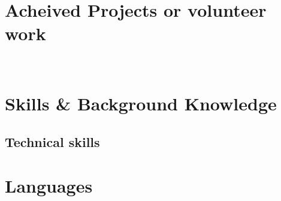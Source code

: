 \documentclass[11pt,a4paper,sans]{moderncv} %
\begin{document}
\section{Acheived Projects or volunteer work}
                 
\

\section{Skills \& Background Knowledge}

\subsection{Technical skills}
                 




\section{Languages}
                 

\end{document}
